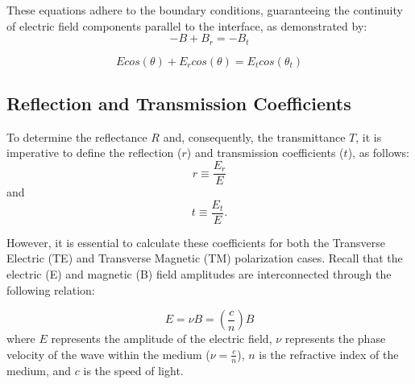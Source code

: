 These equations adhere to the boundary conditions, guaranteeing the continuity of electric field components parallel to the interface, as demonstrated by:
\begin{equation} \label{Magnetic field boundary conditions for TM waves}
-B + B_r = -B_t
\end{equation}

\begin{equation} \label{Electric field boundary conditions for TM waves}
Ecos(\theta) + E_rcos(\theta) = E_tcos(\theta_t)
\end{equation}

\subsection{Reflection and Transmission Coefficients}
To determine the reflectance $R$ and, consequently, the transmittance $T$, it is imperative to define the reflection ($r$) and transmission coefficients ($t$), as follows:
\begin{equation} \label{Definition of the reflection coefficient}
r \equiv \frac{E_r}{E}
\end{equation}
and
\begin{equation} \label{Definition of the transmission coefficient}
t \equiv \frac{E_t}{E}.
\end{equation}

However, it is essential to calculate these coefficients for both the Transverse Electric (TE) and Transverse Magnetic (TM) polarization cases. Recall that the electric (E) and magnetic (B) field amplitudes are interconnected through the following relation:

\begin{equation} \label{Equation relating the electric and magnetic field amplitudes}
E = \nu B = \left(\frac{c}{n}\right)B
\end{equation} where $E$ represents the amplitude of the electric field, $\nu$ represents the phase velocity of the wave within the medium ($\nu=\frac{c}{n}$), $n$ is the refractive index of the medium, and $c$ is the speed of light.

